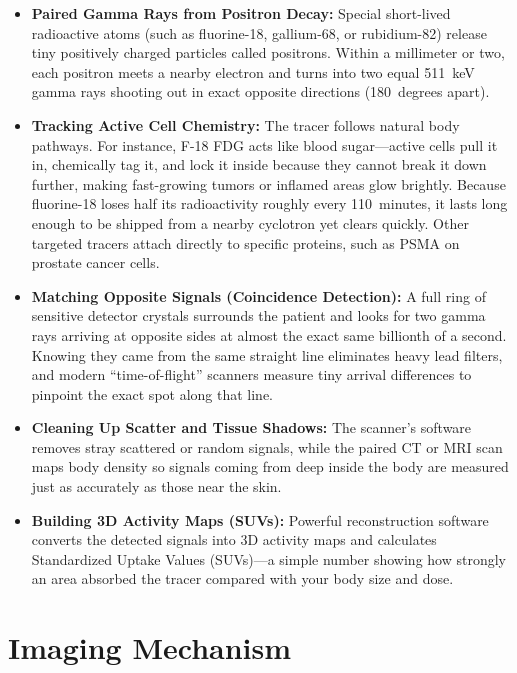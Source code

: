 \begin{itemize}
    \item \textbf{Paired Gamma Rays from Positron Decay:} Special short-lived radioactive atoms (such as fluorine-18, gallium-68, or rubidium-82) release tiny positively charged particles called positrons. Within a millimeter or two, each positron meets a nearby electron and turns into two equal 511~keV gamma rays shooting out in exact opposite directions (180~degrees apart).
    \item \textbf{Tracking Active Cell Chemistry:} The tracer follows natural body pathways. For instance, F-18 FDG acts like blood sugar---active cells pull it in, chemically tag it, and lock it inside because they cannot break it down further, making fast-growing tumors or inflamed areas glow brightly. Because fluorine-18 loses half its radioactivity roughly every 110~minutes, it lasts long enough to be shipped from a nearby cyclotron yet clears quickly. Other targeted tracers attach directly to specific proteins, such as PSMA on prostate cancer cells.
    \item \textbf{Matching Opposite Signals (Coincidence Detection):} A full ring of sensitive detector crystals surrounds the patient and looks for two gamma rays arriving at opposite sides at almost the exact same billionth of a second. Knowing they came from the same straight line eliminates heavy lead filters, and modern ``time-of-flight'' scanners measure tiny arrival differences to pinpoint the exact spot along that line.
    \item \textbf{Cleaning Up Scatter and Tissue Shadows:} The scanner's software removes stray scattered or random signals, while the paired CT or MRI scan maps body density so signals coming from deep inside the body are measured just as accurately as those near the skin.
    \item \textbf{Building 3D Activity Maps (SUVs):} Powerful reconstruction software converts the detected signals into 3D activity maps and calculates Standardized Uptake Values (SUVs)---a simple number showing how strongly an area absorbed the tracer compared with your body size and dose.
\end{itemize}

\section{Imaging Mechanism}

